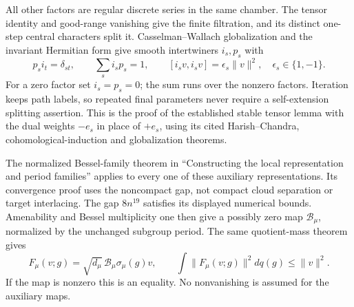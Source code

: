 All other factors are regular discrete series in the same chamber.
The tensor identity and good-range vanishing give the finite
filtration, and its distinct one-step central characters split it.
Casselman--Wallach globalization and the invariant Hermitian form
give smooth intertwiners $i_s,p_s$ with
\[
 p_si_t=\delta_{st},\qquad \sum_s i_sp_s=1,\qquad
 [i_sv,i_sv]=\epsilon_s\|v\|^2,\quad \epsilon_s\in\{1,-1\}.
\]
For a zero factor set $i_s=p_s=0$; the sum runs over the
nonzero factors.  Iteration keeps path labels, so repeated final
parameters never require a self-extension splitting assertion.
This is the proof of the established stable tensor lemma with
the dual weights $-e_s$ in place of $+e_s$, using its cited
Harish--Chandra, cohomological-induction and globalization
theorems.\cite{current-construction-record}

The normalized Bessel-family theorem in ``Constructing the local
representation and period families'' applies to every one of
these auxiliary representations.\cite{current-construction-record}
Its convergence proof
uses the noncompact gap, not compact cloud separation or target
interlacing.  The gap $8n^{19}$ satisfies its displayed numerical
bounds.  Amenability and Bessel multiplicity one then give a
possibly zero map $\mathcal B_\mu$, normalized by the unchanged
subgroup period.  The same quotient-mass theorem gives
\begin{equation}\label{global-gram-quantitative-mass}
 F_\mu(v;g)=\sqrt{d_\mu}\,\mathcal B_\mu\sigma_\mu(g)v,
 \qquad \int\|F_\mu(v;g)\|^2dq(g)\le\|v\|^2.
\end{equation}
If the map is nonzero this is an equality.  No nonvanishing is
assumed for the auxiliary maps.

